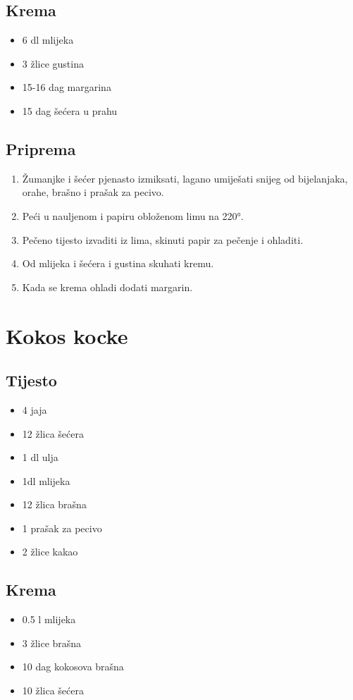 \documentclass{article}
\begin{document}
\subsection{Krema}
\begin{itemize}
    \item 6 dl mlijeka
    \item 3 žlice gustina 
    \item 15-16 dag margarina 
    \item 15 dag šećera u prahu
\end{itemize}

\subsection{Priprema}
\begin{enumerate}
  \item Žumanjke i šećer pjenasto izmiksati, lagano umiješati snijeg od bijelanjaka, orahe, brašno i prašak za pecivo.
  \item Peći u nauljenom i papiru obloženom limu na 220°.
  \item Pečeno tijesto izvaditi iz lima, skinuti papir za pečenje i ohladiti.
  \item Od mlijeka i šećera i gustina skuhati kremu.
  \item Kada se krema ohladi dodati margarin.
\end{enumerate}

\section{Kokos kocke}
\subsection{Tijesto}
\begin{itemize}
  \item 4 jaja
  \item 12 žlica šećera
  \item 1 dl ulja
  \item 1dl mlijeka
  \item 12 žlica brašna
  \item 1 prašak za pecivo
  \item 2 žlice kakao
\end{itemize}

\subsection{Krema}
\begin{itemize}
  \item 0.5 l mlijeka
  \item 3 žlice brašna
  \item 10 dag kokosova brašna
  \item 10 žlica šećera
\end{itemize}
\end{document}
